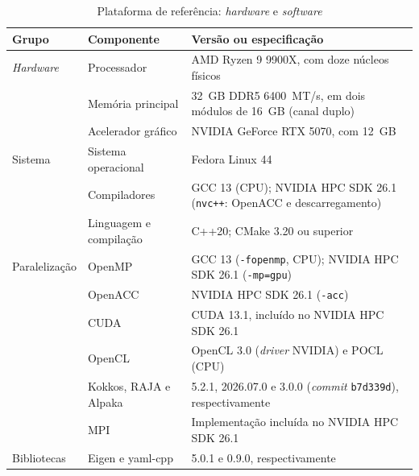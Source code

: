 \begin{table}[H]
    \centering
    \caption{Plataforma de referência: \textit{hardware} e \textit{software}}
    \label{tab:ambiente-computacional}
    \footnotesize
    \begin{tabular}{llp{7.6cm}}
        \toprule
        Grupo & Componente & Versão ou especificação \\
        \midrule
        \textit{Hardware} & Processador & AMD Ryzen 9 9900X, com doze núcleos físicos \\
         & Memória principal & 32~GB DDR5 6400~MT/s, em dois módulos de 16~GB (canal duplo) \\
         & Acelerador gráfico & NVIDIA GeForce RTX 5070, com 12~GB \\
        \midrule
        Sistema & Sistema operacional & Fedora Linux 44 \\
         & Compiladores & GCC 13 (CPU); NVIDIA HPC SDK 26.1 (\texttt{nvc++}: OpenACC e descarregamento) \\
         & Linguagem e compilação & C++20; CMake 3.20 ou superior \\
        \midrule
        Paralelização & OpenMP & GCC 13 (\texttt{-fopenmp}, CPU); NVIDIA HPC SDK 26.1 (\texttt{-mp=gpu}) \\
         & OpenACC & NVIDIA HPC SDK 26.1 (\texttt{-acc}) \\
         & CUDA & CUDA 13.1, incluído no NVIDIA HPC SDK 26.1 \\
         & OpenCL & OpenCL 3.0 (\textit{driver} NVIDIA) e POCL (CPU) \\
         & Kokkos, RAJA e Alpaka & 5.2.1, 2026.07.0 e 3.0.0 (\textit{commit} \texttt{b7d339d}), respectivamente \\
         & MPI & Implementação incluída no NVIDIA HPC SDK 26.1 \\
        \midrule
        Bibliotecas & Eigen e yaml-cpp & 5.0.1 e 0.9.0, respectivamente \\
        \bottomrule
    \end{tabular}
\end{table}

